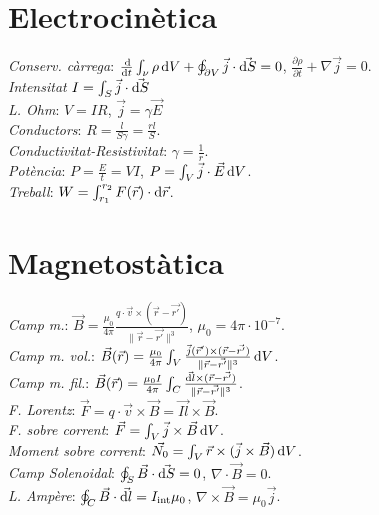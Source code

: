 \section{Electrocinètica}
\emph{Conserv. càrrega}: $\frac{\dif}{\dif t} \int_\nu \rho \dif V + 
                          \oint_{\partial V} \vec{j} \cdot \vec{\dif S} = 0$,
                          $\frac{\partial\rho}{\partial t} + \nabla \vec{j} = 0 $.\\
\emph{Intensitat} $I = \int_S \vec{j} \cdot \vec{\dif S}$\\
\emph{L. Ohm}: $V=IR$, $\vec{j} = \gamma \vec{E}$\\
\emph{Conductors}: $R = \frac{l}{S\gamma} = \frac{rl}{S}$. \\
\emph{Conductivitat-Resistivitat}: $\gamma = \frac{1}{r}$. \\
\emph{Potència}: $P=\frac{E}{t}=VI$, $P = \int_{V} \vec{j} \cdot \vec{E} \dif V$. \\
\emph{Treball}: $W=\int_{r_1}^{r_2} F(\vec{r}) \cdot \dif \vec{r}$.

\section{Magnetostàtica}
\emph{Camp m.}: $\vec{B} = \frac{\mu_0}{4\pi}\frac{q\cdot \vec{v}\times (\vec{r} - \vec{r'})}{\|\vec{r} -\vec{r'}\|^3}$, $\mu_0=4\pi \cdot 10^{-7}$. \\
\emph{Camp m. vol.}: $\vec{B}(\vec{r}) = \frac{\mu_0}{4\pi}\int_V
                     \frac{ \vec{j}(\vec{r}') \times (\vec{r} - \vec{r'})}
                     {\|\vec{r} -\vec{r'}\|^3} \dif V$.\\
\emph{Camp m. fil.}: $\vec{B}(\vec{r}) = \frac{\mu_0 I}{4\pi}\int_C
                     \frac{ \vec{\dif l} \times (\vec{r} - \vec{r'})}
                     {\|\vec{r} -\vec{r'}\|^3}$.\\
\emph{F. Lorentz}: $\vec{F} = q \cdot\vec{v}\times\vec{B} = \vec{Il} \times \vec{B}$. \\

\emph{F. sobre corrent}: $\vec{F} = \int_V \vec{j} \times \vec{B} \dif V$.\\
\emph{Moment sobre corrent}: $\vec{N_0} = \int_V \vec{r} \times (\vec{j} \times
                            \vec{B}) \dif V$.\\
\emph{Camp Solenoidal}: $\oint_S \vec{B} \cdot \vec{\dif S} = 0$, $\nabla \cdot \vec{B} = 0$.\\
\emph{L. Ampère}: $\oint_C \vec{B}\cdot \vec{\dif l} = I_{\text{int}} \mu_0$, $\nabla \times \vec{B} = \mu_0 \vec{j}$.

